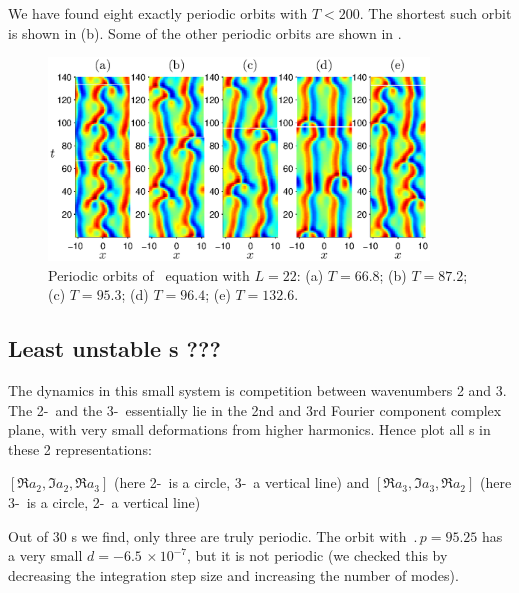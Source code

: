 We have found eight exactly periodic orbits with $T < 200$.  The
shortest such orbit is shown in (b).  Some
of the other periodic orbits are shown in .

\begin{figure}[t]
\begin{center}
\includegraphics[width=0.9\textwidth]{figs/ks22rposPO.eps}
\end{center}
\caption{Periodic orbits of \KS\ equation with $L = 22$: (a) $T =
66.8$; (b) $T = 87.2$; (c) $T = 95.3$; (d) $T = 96.4$; (e) $T =
132.6$.}\label{f:ks22rposPO}
\end{figure}


\subsection{Least unstable \rpo s ???}

The dynamics in this small system is competition between wavenumbers
2 and 3. The 2-\eqv\  and the 3-\eqv\  essentially lie in
the 2nd and 3rd Fourier component complex plane, with very
small deformations from higher harmonics.
Hence plot all \rpo s in these 2 representations:

$[ \Re a_2, \Im a_2, \Re a_3 ]$
(here 2-\eqv\  is a circle, 3-\eqv\ a vertical line)
 and
$[ \Re a_3, \Im a_3, \Re a_2 ]$
(here 3-\eqv\ is a circle, 2-\eqv\ a vertical line)

%
Out of 30 \rpo s we
find,  only three are truly periodic.  The orbit
with $\period{p} = 95.25$ has a very small
$d = -6.5\,\times 10^{-7}$, but it is not periodic
(we
checked this by decreasing the integration step size and increasing the
number of modes).


